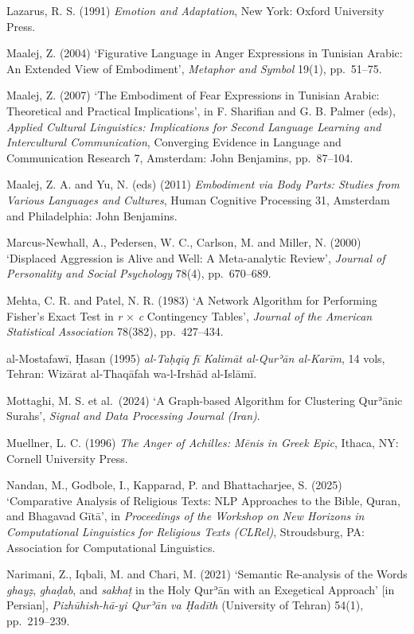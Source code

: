 Lazarus, R. S. (1991) \emph{Emotion and Adaptation}, New York: Oxford
University Press.

Maalej, Z. (2004) `Figurative Language in Anger Expressions in Tunisian
Arabic: An Extended View of Embodiment', \emph{Metaphor and Symbol}
19(1), pp.~51--75.

Maalej, Z. (2007) `The Embodiment of Fear Expressions in Tunisian
Arabic: Theoretical and Practical Implications', in F. Sharifian and G.
B. Palmer (eds), \emph{Applied Cultural Linguistics: Implications for
Second Language Learning and Intercultural Communication}, Converging
Evidence in Language and Communication Research 7, Amsterdam: John
Benjamins, pp.~87--104.

Maalej, Z. A. and Yu, N. (eds) (2011) \emph{Embodiment via Body Parts:
Studies from Various Languages and Cultures}, Human Cognitive Processing
31, Amsterdam and Philadelphia: John Benjamins.

Marcus-Newhall, A., Pedersen, W. C., Carlson, M. and Miller, N. (2000)
`Displaced Aggression is Alive and Well: A Meta-analytic Review',
\emph{Journal of Personality and Social Psychology} 78(4), pp.~670--689.

Mehta, C. R. and Patel, N. R. (1983) `A Network Algorithm for Performing
Fisher's Exact Test in \emph{r} × \emph{c} Contingency Tables',
\emph{Journal of the American Statistical Association} 78(382),
pp.~427--434.

al-Mostafawī, Ḥasan (1995) \emph{al-Taḥqīq fī Kalimāt al-Qurʾān
al-Karīm}, 14 vols, Tehran: Wizārat al-Thaqāfah wa-l-Irshād al-Islāmī.

Mottaghi, M. S. et al.~(2024) `A Graph-based Algorithm for Clustering
Qurʾānic Surahs', \emph{Signal and Data Processing Journal (Iran)}.

Muellner, L. C. (1996) \emph{The Anger of Achilles: Mēnis in Greek
Epic}, Ithaca, NY: Cornell University Press.

Nandan, M., Godbole, I., Kapparad, P. and Bhattacharjee, S. (2025)
`Comparative Analysis of Religious Texts: NLP Approaches to the Bible,
Quran, and Bhagavad Gītā', in \emph{Proceedings of the Workshop on New
Horizons in Computational Linguistics for Religious Texts (CLRel)},
Stroudsburg, PA: Association for Computational Linguistics.

Narimani, Z., Iqbali, M. and Chari, M. (2021) `Semantic Re-analysis of
the Words \emph{ghayẓ}, \emph{ghaḍab}, and \emph{sakhaṭ} in the Holy
Qurʾān with an Exegetical Approach' {[}in Persian{]},
\emph{Pizhūhish-hā-yi Qurʾān va Ḥadīth} (University of Tehran) 54(1),
pp.~219--239.

